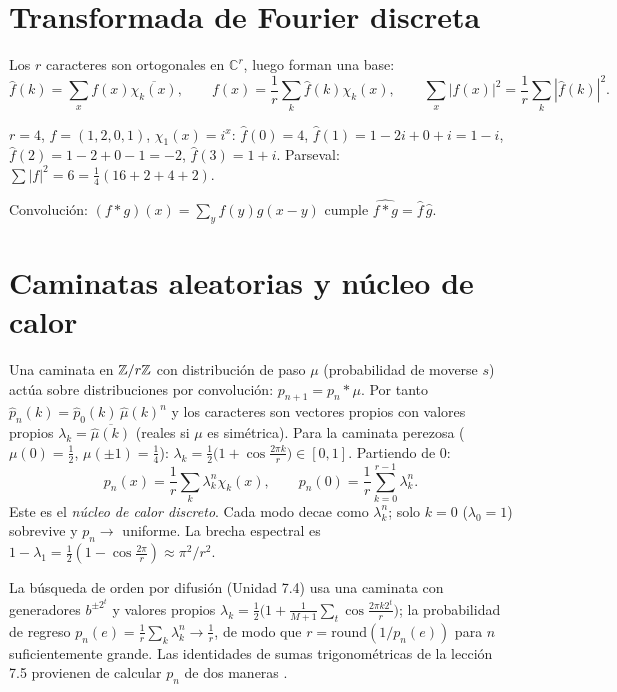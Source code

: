 \documentclass[11pt,a4paper]{article}
\begin{document}
\section{Transformada de Fourier discreta}
Los $r$ caracteres son ortogonales en $\mathbb C^r$, luego forman una base:
\begin{equation}\hat f(k)=\sum_xf(x)\overline{\chi_k(x)},\qquad f(x)=\frac1r\sum_k\hat f(k)\chi_k(x),\qquad
\sum_x|f(x)|^2=\frac1r\sum_k|\hat f(k)|^2.\end{equation}
\begin{ejemplo}
$r=4$, $f=(1,2,0,1)$, $\chi_1(x)=i^x$: $\hat f(0)=4$, $\hat f(1)=1-2i+0+i=1-i$, $\hat f(2)=1-2+0-1=-2$,
$\hat f(3)=1+i$. Parseval: $\sum|f|^2=6=\frac14(16+2+4+2)$.
\end{ejemplo}
Convolución: $(f*g)(x)=\sum_yf(y)g(x-y)$ cumple $\widehat{f*g}=\hat f\,\hat g$.

\section{Caminatas aleatorias y núcleo de calor}
Una caminata en $\mathbb{Z}/r\mathbb{Z}$ con distribución de paso $\mu$ (probabilidad de moverse $s$) actúa sobre distribuciones
por convolución: $p_{n+1}=p_n*\mu$. Por tanto $\hat p_n(k)=\hat p_0(k)\,\hat\mu(k)^n$ y los caracteres son vectores
propios con valores propios $\lambda_k=\overline{\hat\mu(k)}$ (reales si $\mu$ es simétrica). Para la caminata
perezosa ($\mu(0)=\frac12$, $\mu(\pm1)=\frac14$): $\lambda_k=\frac12\big(1+\cos\frac{2\pi k}r\big)\in[0,1]$. Partiendo de $0$:
\begin{equation}p_n(x)=\frac1r\sum_k\lambda_k^n\chi_k(x),\qquad p_n(0)=\frac1r\sum_{k=0}^{r-1}\lambda_k^n .\end{equation}
Este es el \emph{núcleo de calor discreto}. Cada modo decae como $\lambda_k^n$; solo $k=0$ ($\lambda_0=1$) sobrevive y
$p_n\to$ uniforme. La brecha espectral es $1-\lambda_1=\frac12(1-\cos\frac{2\pi}r)\approx\pi^2/r^2$.

\begin{aplicacion}
La búsqueda de orden por difusión (Unidad 7.4) usa una caminata con generadores $b^{\pm2^t}$ y valores propios
$\lambda_k=\frac12\big(1+\frac1{M+1}\sum_t\cos\frac{2\pi k2^t}{r}\big)$; la probabilidad de regreso
$p_n(e)=\frac1r\sum_k\lambda_k^n\to\frac1r$, de modo que $r=\mathrm{round}(1/p_n(e))$ para $n$ suficientemente grande.
Las identidades de sumas trigonométricas de la lección 7.5 provienen de calcular $p_n$ de dos maneras \cite{cadavid3}.
\end{aplicacion}
\end{document}
